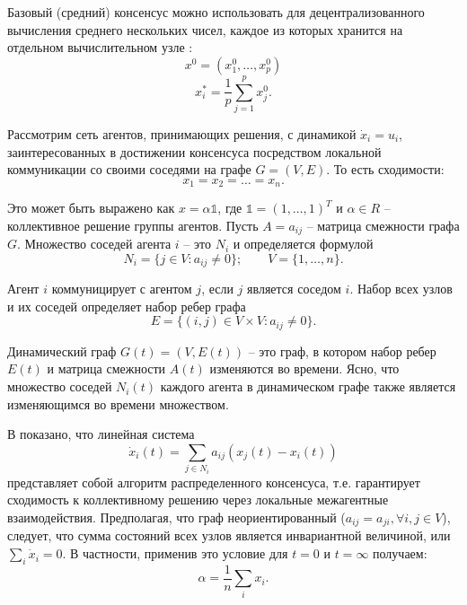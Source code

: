 \documentclass[a4paper,article,14pt]{extarticle}
\begin{document}
Базовый (средний) консенсус можно использовать для децентрализованного вычисления среднего нескольких чисел, каждое из которых хранится на отдельном вычислительном узле \cite{consensus_basics}:
\begin{equation}
x^0 = (x_1^0, \ldots, x_p^0)
\end{equation}
\begin{equation}
x_i^* = \frac{1}{p}\sum_{j=1}^{p}x_j^0.
\end{equation}

Рассмотрим сеть агентов, принимающих решения, с динамикой $\dot x_i = u_i$, заинтересованных в достижении консенсуса посредством локальной коммуникации со своими соседями на графе $G = (V, E)$.
То есть сходимости:
\begin{equation}
x_1 = x_2 = \ldots = x_n.
\end{equation}

Это может быть выражено как $x = \alpha \mathds{1} $, где $\mathds{1} = (1, \ldots, 1)^T$ и $\alpha \in R$ -- коллективное решение группы агентов. Пусть $A = a_{ij}$ -- матрица смежности графа $G$. Множество соседей агента $i$ -- это $N_i$ и определяется формулой
\begin{equation}
N_i = \{ j \in V: a_{ij} \ne 0 \}; \quad \quad V = \{1, \ldots, n\}.
\end{equation}

Агент $i$ коммуницирует с агентом $j$, если $j$ является соседом $i$. Набор всех узлов и их соседей определяет набор ребер графа
\begin{equation}
E = \{ (i,j) \in V\times V: a_{ij} \ne 0\}.
\end{equation}

Динамический граф $G(t) = (V, E(t))$ -- это граф, в котором набор ребер $E(t)$ и матрица смежности $A(t)$ изменяются во времени. Ясно, что множество соседей $N_i(t)$ каждого агента в динамическом графе также является изменяющимся во времени множеством.

В \cite{consensus_basics_2} показано, что линейная система
\begin{equation} \label{eq:system_dynamic}
\dot x_i(t) = \sum_{j \in N_i} a_{ij}(x_j(t)-x_i(t))
\end{equation}
представляет собой алгоритм распределенного консенсуса, т.е. гарантирует сходимость к коллективному решению через локальные межагентные взаимодействия. Предполагая, что граф неориентированный ($a_{ij}=a_{ji}, \forall i,j \in V$), следует, что сумма состояний всех узлов является инвариантной величиной, или $\sum_i \dot x_i = 0$. В частности, применив это условие для $t = 0 \text{ и } t = \infty$ получаем:
\begin{equation}
\alpha = \frac{1}{n}\sum_i x_i.
\end{equation}
\end{document}
